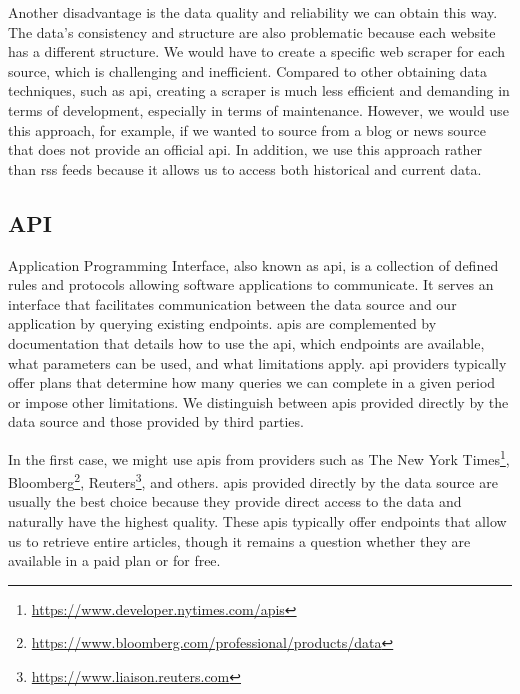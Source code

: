 Another disadvantage is the data quality and reliability we can obtain this way. The data's consistency and structure are also problematic because each website has a different structure. We would have to create a specific web scraper for each source, which is challenging and inefficient. Compared to other obtaining data techniques, such as \acrshort{api}, creating a scraper is much less efficient and demanding in terms of development, especially in terms of maintenance. However, we would use this approach, for example, if we wanted to source from a blog or news source that does not provide an official \acrshort{api}. In addition, we use this approach rather than \acrshort{rss} feeds because it allows us to access both historical and current data.

\subsection{API}
\label{sec:textual-data-api}
Application Programming Interface, also known as \acrshort{api}, is a collection of defined rules and protocols allowing software applications to communicate. It serves an interface that facilitates communication between the data source and our application by querying existing endpoints. \acrshort{api}s are complemented by documentation that details how to use the \acrshort{api}, which endpoints are available, what parameters can be used, and what limitations apply. \acrshort{api} providers typically offer plans that determine how many queries we can complete in a given period or impose other limitations. We distinguish between \acrshort{api}s provided directly by the data source and those provided by third parties.

In the first case, we might use \acrshort{api}s from providers such as The New York Times\footnote{\href{https://www.developer.nytimes.com/apis}{https://www.developer.nytimes.com/apis}}, Bloomberg\footnote{\href{https://www.bloomberg.com/professional/products/data}{https://www.bloomberg.com/professional/products/data}}, Reuters\footnote{\href{https://www.liaison.reuters.com}{https://www.liaison.reuters.com}}, and others. \acrshort{api}s provided directly by the data source are usually the best choice because they provide direct access to the data and naturally have the highest quality. These \acrshort{api}s typically offer endpoints that allow us to retrieve entire articles, though it remains a question whether they are available in a paid plan or for free. %

